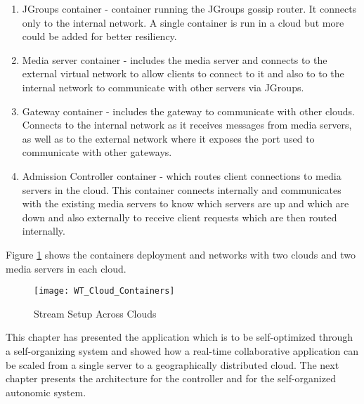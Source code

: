 \begin{enumerate} 
	\item JGroups container - container running the JGroups gossip router. It connects only to the internal network. A single container is run in a cloud but more could be added for better resiliency.
	\item Media server container - includes the media server and connects to the external virtual network to allow clients to connect to it and also to to the internal network to communicate with other servers via JGroups.
	\item Gateway container - includes the gateway to communicate with other clouds. Connects to the internal network as it receives messages from media servers, as well as to the external network where it exposes the port used to communicate with other gateways.
	\item Admission Controller container - which routes client connections to media servers in the cloud. This container connects internally and communicates with the existing media servers to know which servers are up and which are down and also externally to receive client requests which are then routed internally.
\end{enumerate}

Figure \ref{fig:cloudcontainers} shows the containers deployment and networks with two clouds and two media servers in each cloud.

\begin{figure}
	\centering
	\texttt{[image: WT\_Cloud\_Containers]}
	\caption{Stream Setup Across Clouds}
	\label{fig:cloudcontainers}
\end{figure}

This chapter has presented the application which is to be self-optimized through a self-organizing system and showed how a real-time collaborative application can be scaled from a single server to a geographically distributed cloud. The next chapter presents the architecture for the controller and for the self-organized autonomic system.